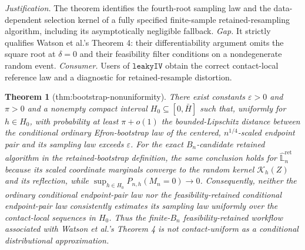 \documentclass{article}
\newtheorem{theorem}{Theorem}
\begin{document}
\par\smallskip\noindent \textit{Justification.} The theorem identifies the fourth-root sampling law and the data-dependent selection kernel of a fully specified finite-sample retained-resampling algorithm, including its asymptotically negligible fallback. \textit{Gap.} It strictly qualifies Watson et al.'s Theorem 4: their differentiability argument omits the square root at \(\delta=0\) and their feasibility filter conditions on a nondegenerate random event. \textit{Consumer.} Users of \(\texttt{leakyIV}\) obtain the correct contact-local reference law and a diagnostic for retained-resample distortion.

\begin{theorem}[thm:bootstrap-nonuniformity]\label{thm:bootstrap-nonuniformity}
There exist constants \(\varepsilon>0\) and \(\pi>0\) and a nonempty compact interval \(H_0\subseteq[0,\bar H]\) such that, uniformly for \(h\in H_0\), with probability at least \(\pi+o(1)\) the bounded-Lipschitz distance between the conditional ordinary Efron-bootstrap law of the centered, \(n^{1/4}\)-scaled endpoint pair and its sampling law exceeds \(\varepsilon\). For the exact \(B_n\)-candidate retained algorithm in the retained-bootstrap definition, the same conclusion holds for \(\widehat{\mathbb L}_n^{\mathrm{ret}}\) because its scaled coordinate marginals converge to the random kernel \(\mathcal K_h(Z)\) and its reflection, while \(\sup_{h\in H_0}P_{n,h}(M_n=0)\to0\). Consequently, neither the ordinary conditional endpoint-pair law nor the feasibility-retained conditional endpoint-pair law consistently estimates its sampling law uniformly over the contact-local sequences in \(H_0\). Thus the finite-\(B_n\) feasibility-retained workflow associated with Watson et al.'s Theorem 4 is not contact-uniform as a conditional distributional approximation.
\end{theorem}
\end{document}
